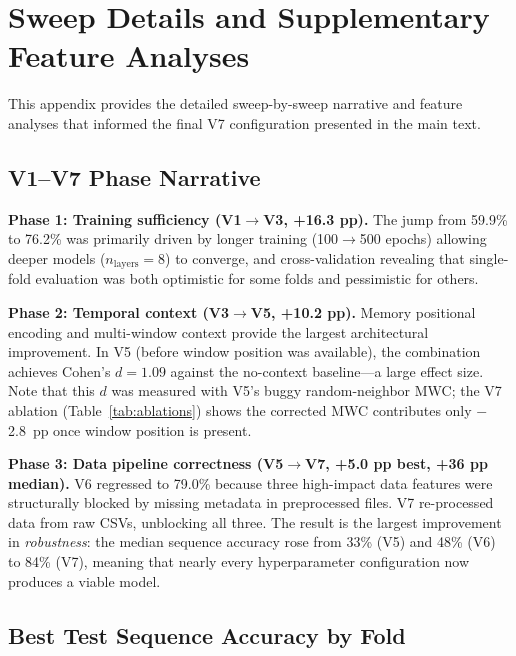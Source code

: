 \documentclass[sensors,article,submit,moreauthors,pdftex]{Definitions/mdpi}
\begin{document}
\section{Sweep Details and Supplementary Feature Analyses}
\label{sec:appendix_sweep}

This appendix provides the detailed sweep-by-sweep narrative and feature analyses that informed the final V7 configuration presented in the main text.

\subsection{V1--V7 Phase Narrative}

\textbf{Phase 1: Training sufficiency (V1$\to$V3, +16.3 pp).} The jump from 59.9\% to 76.2\% was primarily driven by longer training (100$\to$500 epochs) allowing deeper models ($n_\text{layers} = 8$) to converge, and cross-validation revealing that single-fold evaluation was both optimistic for some folds and pessimistic for others.

\textbf{Phase 2: Temporal context (V3$\to$V5, +10.2 pp).} Memory positional encoding and multi-window context provide the largest architectural improvement. In V5 (before window position was available), the combination achieves Cohen's $d = 1.09$ against the no-context baseline---a large effect size. Note that this $d$ was measured with V5's buggy random-neighbor MWC; the V7 ablation (Table~\ref{tab:ablations}) shows the corrected MWC contributes only $-$2.8~pp once window position is present.

\textbf{Phase 3: Data pipeline correctness (V5$\to$V7, +5.0 pp best, +36 pp median).} V6 regressed to 79.0\% because three high-impact data features were structurally blocked by missing metadata in preprocessed files. V7 re-processed data from raw CSVs, unblocking all three. The result is the largest improvement in \emph{robustness}: the median sequence accuracy rose from 33\% (V5) and 48\% (V6) to 84\% (V7), meaning that nearly every hyperparameter configuration now produces a viable model.

\subsection{Best Test Sequence Accuracy by Fold}
\end{document}
